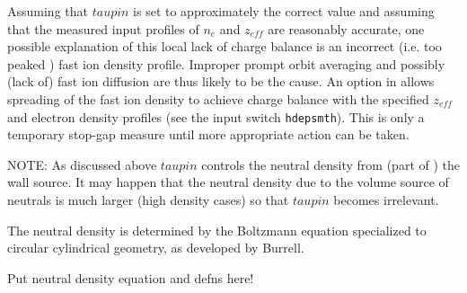 Assuming that $taupin $ is set to approximately the correct value and assuming
that the measured input profiles of $n_e$ and $z_{eff}$ are reasonably
accurate,  one possible explanation of this local lack of charge balance is an
incorrect (i.e. too peaked ) fast ion density profile. Improper prompt orbit
averaging and possibly (lack of) fast ion diffusion are thus likely to be the
cause. An option in \ot allows spreading of the fast ion density to achieve
charge balance with the specified $z_{eff}$ and electron density profiles (see
the input switch \texttt{hdepsmth}). This is only a temporary  stop-gap measure
until more appropriate action can be taken. 

NOTE: As discussed above $taupin $ controls the neutral density from (part of )
the wall source. It may happen that the neutral density due to the volume source
of neutrals is much larger (high density cases) so that $taupin $  becomes
irrelevant.

The neutral density is determined by the Boltzmann equation specialized to 
circular cylindrical geometry, as developed by Burrell\cite{Burrell:78}.

\begin{center}
 Put neutral density equation and defns here!
\end{center}


